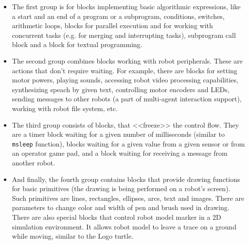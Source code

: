 \documentclass[conference]{IEEEtran}
\begin{document}
\begin{itemize}
    \item The first group is for blocks implementing basic algorithmic expressions, like a start and an end of a program or a subprogram, conditions, switches, arithmetic loops, blocks for parallel execution and for working with concurrent tasks (e.g. for merging and interrupting tasks), subprogram call block and a block for textual programming.
    \item The second group combines blocks working with robot peripherals. These are actions that don't require waiting. For example, there are blocks for setting motor powers, playing sounds, accessing robot video processing capabilities, synthesizing speach by given text, controlling motor encoders and LEDs, sending messages to other robots (a part of multi-agent interaction support), working with robot file system, etc.
    \item The third group consists of blocks, that <<freeze>> the control flow. They are a timer block waiting for a given number of milliseconds (similar to \texttt{msleep} function), blocks waiting for a given value from a given sensor or from an operator game pad, and a block waiting for receiving a message from another robot. 
    \item And finally, the fourth group contains blocks that provide drawing functions for basic primitives (the drawing is being performed on a robot's screen). Such primitives are lines, rectangles, ellipses, arcs, text and images. There are parameters to change color and width of pen and brush used in drawing. There are also special blocks that control robot model marker in a 2D simulation environment. It allows robot model to leave a trace on a ground while moving, similar to the Logo turtle.
\end{itemize}
\end{document}
